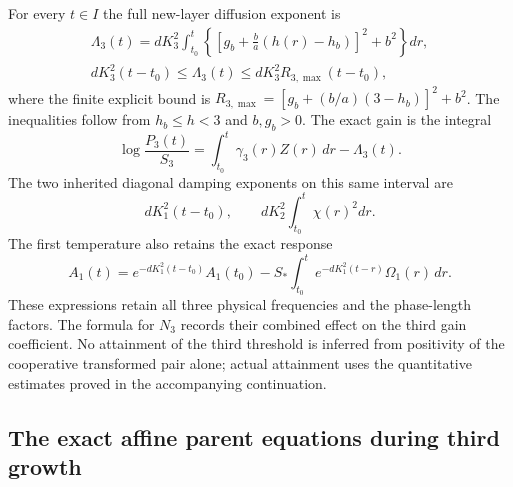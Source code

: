 For every $t\in I$ the full new-layer diffusion exponent is
\begin{equation}\label{cvlane:tg:diffusion}
\begin{gathered}
 \Lambda_3(t)=dK_3^2\int_{t_0}^t
       \left\{\left[g_b+\frac ba(h(r)-h_b)\right]^2+b^2\right\}dr,\\
 dK_3^2(t-t_0)\leq\Lambda_3(t)
        \leq dK_3^2R_{3,\max}(t-t_0),
\end{gathered}
\end{equation}
where the finite explicit bound is
$R_{3,\max}=[g_b+(b/a)(3-h_b)]^2+b^2$.
The inequalities follow from $h_b\leq h<3$ and $b,g_b>0$.
The exact gain is the integral
\[
 \log\frac{P_3(t)}{S_3}
    =\int_{t_0}^t\gamma_3(r)Z(r)\,dr-\Lambda_3(t).
\]
The two inherited diagonal damping exponents on this same interval are
\[
 dK_1^2(t-t_0),\qquad dK_2^2\int_{t_0}^t\chi(r)^2dr.
\]
The first temperature also retains the exact response
\[
 A_1(t)=e^{-dK_1^2(t-t_0)}A_1(t_0)
       -S_*\int_{t_0}^t e^{-dK_1^2(t-r)}\Omega_1(r)\,dr.
\]
These expressions retain all three physical frequencies and the
phase-length factors. The formula for $N_3$ records their combined
effect on the third gain coefficient. No attainment of the third
threshold is inferred from positivity of the cooperative transformed
pair alone; actual attainment uses the quantitative estimates proved
in the accompanying continuation.

\subsection{The exact affine parent equations during third growth}

